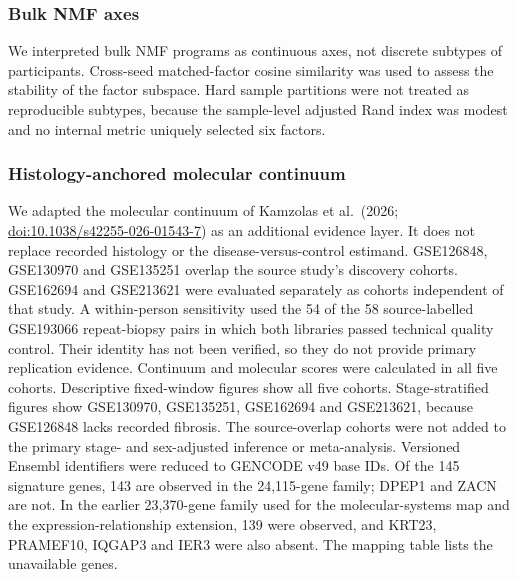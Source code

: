 \subsubsection{Bulk NMF axes}\label{bulk-nmf-axes}

We interpreted bulk NMF programs as continuous axes, not discrete subtypes of participants. Cross-seed matched-factor cosine similarity was used to assess the stability of the factor subspace. Hard sample partitions were not treated as reproducible subtypes, because the sample-level adjusted Rand index was modest and no internal metric uniquely selected six factors.

\subsubsection{Histology-anchored molecular continuum}\label{histology-anchored-molecular-continuum}

We adapted the molecular continuum of Kamzolas et al.~(2026; \url{doi:10.1038/s42255-026-01543-7}) as an additional evidence layer. It does not replace recorded histology or the disease-versus-control estimand. GSE126848, GSE130970 and GSE135251 overlap the source study's discovery cohorts. GSE162694 and GSE213621 were evaluated separately as cohorts independent of that study. A within-person sensitivity used the 54 of the 58 source-labelled GSE193066 repeat-biopsy pairs in which both libraries passed technical quality control. Their identity has not been verified, so they do not provide primary replication evidence. Continuum and molecular scores were calculated in all five cohorts. Descriptive fixed-window figures show all five cohorts. Stage-stratified figures show GSE130970, GSE135251, GSE162694 and GSE213621, because GSE126848 lacks recorded fibrosis. The source-overlap cohorts were not added to the primary stage- and sex-adjusted inference or meta-analysis. Versioned Ensembl identifiers were reduced to GENCODE v49 base IDs. Of the 145 signature genes, 143 are observed in the 24,115-gene family; DPEP1 and ZACN are not. In the earlier 23,370-gene family used for the molecular-systems map and the expression-relationship extension, 139 were observed, and KRT23, PRAMEF10, IQGAP3 and IER3 were also absent. The mapping table lists the unavailable genes.

